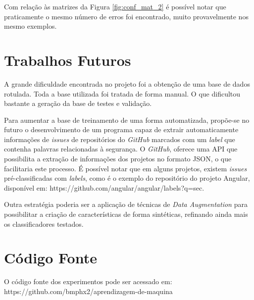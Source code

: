 \documentclass[conference]{IEEEtran}
\begin{document}
Com relação às matrizes da Figura \ref{fig:conf_mat_2} é possível notar que praticamente o mesmo número de erros foi encontrado, muito provavelmente nos mesmo exemplos.

\section{Trabalhos Futuros}

A grande dificuldade encontrada no projeto foi a obtenção de uma base de dados rotulada. Toda a base utilizada foi tratada de forma manual. O que dificultou bastante a geração da base de testes e validação.

Para aumentar a base de treinamento de uma forma automatizada, propõe-se no futuro o desenvolvimento de um programa capaz de extrair automaticamente informações de \textit{issues} de repositórios do \textit{GitHub} marcados com um \textit{label} que contenha palavras relacionadas à segurança. O \textit{GitHub}, oferece uma API que possibilita a extração de informações dos projetos no formato JSON, o que facilitaria este processo. É possível notar que em alguns projetos, existem \textit{issues} pré-classificadas com \textit{labels}, como é o exemplo do repositório do projeto Angular, disponível em: https://github.com/angular/angular/labels?q=sec.

Outra estratégia poderia ser a aplicação de técnicas de \textit{Data Augmentation} para possibilitar a criação de características de forma sintéticas, refinando ainda mais os classificadores testados.

\section{Código Fonte}

O código fonte dos experimentos pode ser acessado em: https://github.com/bmphx2/aprendizagem-de-maquina



\end{document}
